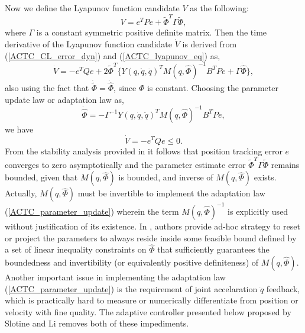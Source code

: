 \documentclass[letterpaper, 10 pt, conference]{ieeeconf}  %
\begin{document}
Now we define the Lyapunov function candidate $V$ as the following:
\begin{equation*}
V = e^{T}Pe + \tilde{\Phi}^{T}\Gamma\tilde{\Phi},
\end{equation*}
where $\Gamma$ is a constant symmetric positive definite matrix.
Then the time derivative of the Lyapunov function candidate $\dot{V}$ is derived from (\ref{ACTC_CL_error_dyn}) and (\ref{ACTC_lyapunov_eq}) as,
\begin{equation*}
\dot{V} = -e^{T}Qe + 2\tilde{\Phi}^{T}\{Y(q,\dot{q},\ddot{q})^{T}M(q,\hat{\Phi})^{-1}B^{T}Pe+\Gamma\dot{\hat{\Phi}}\},
\end{equation*}
also using the fact that $\dot{\tilde{\Phi}} = \dot{\hat{\Phi}}$, since $\Phi$ is constant. Choosing the parameter update law or adaptation law as,
\begin{equation}
\dot{\hat{\Phi}} = -\Gamma^{-1}Y(q,\dot{q},\ddot{q})^{T}M(q,\hat{\Phi})^{-1}B^{T}Pe, \label{ACTC_parameter_update}
\end{equation}
we have 
\begin{equation*}
\dot{V} = -e^{T}Qe \leq 0 .
\end{equation*}
From the stability analysis provided in \cite{Craig_AdaptiveControl} it follows that position tracking error $e$ converges to zero asymptotically and the parameter estimate error $\tilde{\Phi}^{T}\Gamma\tilde{\Phi}$ remains bounded, given that $M(q,\hat{\Phi})$ is bounded, and inverse of $M(q,\hat{\Phi})$ exists. Actually, $M(q,\hat{\Phi})$ must be invertible to implement the adaptation law (\ref{ACTC_parameter_update}) wherein the term $M(q, \hat{\Phi})^{-1}$ is explicitly used without justification of its existence. In \cite{Craig_AdaptiveControl}, authors provide ad-hoc strategy to reset or project the parameters to always reside inside some feasible bound defined by a set of linear inequality constraints on $\hat{\Phi}$ that sufficiently guarantees the boundedness and invertibility (or equivalently positive definiteness) of $M(q,\hat{\Phi})$. Another important issue in implementing the adaptation law (\ref{ACTC_parameter_update}) is the requirement of joint accelaration $\ddot{q}$ feedback, which is practically hard to measure or numerically differentiate from position or velocity with fine quality. The adaptive controller presented below proposed by Slotine and Li \cite{Slotine_AdaptiveControl} removes both of these impediments.
\end{document}
